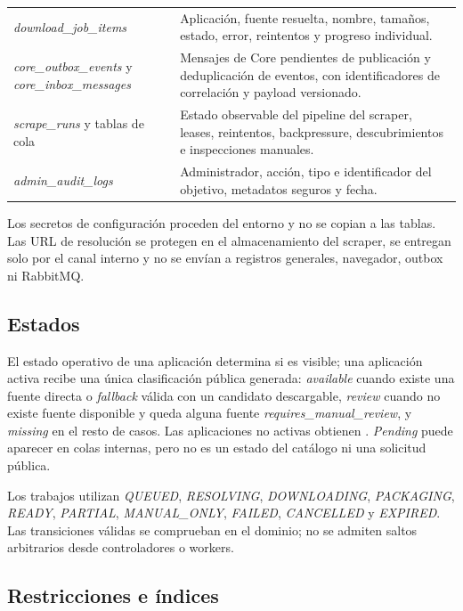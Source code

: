 \begin{longtable}{p{}p{}}
\emph{download\_job\_items} & Aplicación, fuente resuelta, nombre, tamaños, estado, error, reintentos y progreso individual.\\
\emph{core\_outbox\_events} y \emph{core\_inbox\_messages} & Mensajes de Core pendientes de publicación y deduplicación de eventos, con identificadores de correlación y payload versionado.\\
\emph{scrape\_runs} y tablas de cola & Estado observable del pipeline del scraper, leases, reintentos, backpressure, descubrimientos e inspecciones manuales.\\
\emph{admin\_audit\_logs} & Administrador, acción, tipo e identificador del objetivo, metadatos seguros y fecha.\\
\bottomrule
\end{longtable}
\endgroup

Los secretos de configuración proceden del entorno y no se copian a las tablas. Las URL de resolución se protegen en el almacenamiento del scraper, se entregan solo por el canal interno y no se envían a registros generales, navegador, outbox ni RabbitMQ.

\subsection{Estados}

El estado operativo de una aplicación determina si es visible; una aplicación activa recibe una única clasificación pública generada: \emph{available} cuando existe una fuente directa o \emph{fallback} válida con un candidato descargable, \emph{review} cuando no existe fuente disponible y queda alguna fuente \emph{requires\_manual\_review}, y \emph{missing} en el resto de casos. Las aplicaciones no activas obtienen . \emph{Pending} puede aparecer en colas internas, pero no es un estado del catálogo ni una solicitud pública.

Los trabajos utilizan \emph{QUEUED}, \emph{RESOLVING}, \emph{DOWNLOADING}, \emph{PACKAGING}, \emph{READY}, \emph{PARTIAL}, \emph{MANUAL\_ONLY}, \emph{FAILED}, \emph{CANCELLED} y \emph{EXPIRED}. Las transiciones válidas se comprueban en el dominio; no se admiten saltos arbitrarios desde controladores o workers.

\subsection{Restricciones e índices}

